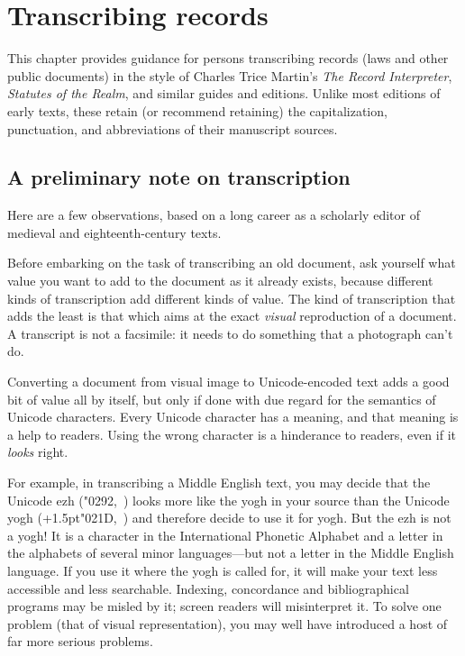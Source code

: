 \chapter{Transcribing records}

This chapter provides guidance for persons transcribing records (laws and other
public documents) in the style of Charles Trice Martin’s
\textit{The Record Interpreter}, \textit{Statutes of the Realm}, and similar guides
and editions.
Unlike most editions of early texts, these retain (or recommend retaining) the capitalization,
punctuation, and abbreviations of their manuscript sources.

\section{A preliminary note on transcription}
Here are a few observations, based on a long career as a scholarly editor of medieval and eighteenth-century texts.

Before embarking on the task of transcribing an old document, ask yourself what value you want to add to the document as
it already exists, because different kinds of transcription add different kinds of value. The kind of transcription
that adds the least is that which aims at the exact \textit{visual} reproduction of a document. A transcript is not a
facsimile: it needs to do something that a photograph can't do.

Converting a document from visual image to Unicode-encoded text adds a good bit of value all by itself, but only if done
with due regard for the semantics of Unicode characters. Every Unicode character has a meaning, and that meaning is a
help to readers. Using the wrong character is a hinderance to readers, even if it \textit{looks} right.

For example, in transcribing a Middle English text, you may decide that the Unicode ezh (\char"0292,~) looks more like
the yogh in your source than the Unicode yogh (\kern+1.5pt\char"021D,~) and therefore decide to use it for yogh. But the ezh is
not a yogh! It is a character in the International Phonetic Alphabet and a letter in the alphabets of several minor
languages---but not a letter in the Middle English language. If you use it where the yogh is called for, it will make
your text less accessible and less searchable. Indexing, concordance and bibliographical programs may be misled by it;
screen readers will misinterpret it. To solve one problem (that of visual representation), you may well have introduced
a host of far more serious problems.

